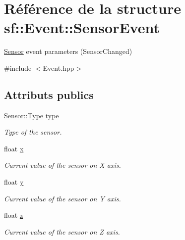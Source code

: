 \hypertarget{structsf_1_1Event_1_1SensorEvent}{}\section{Référence de la structure sf\+:\+:Event\+:\+:Sensor\+Event}
\label{structsf_1_1Event_1_1SensorEvent}


\hyperlink{classsf_1_1Sensor}{Sensor} event parameters (Sensor\+Changed)  




{\ttfamily \#include $<$Event.\+hpp$>$}

\subsection*{Attributs publics}
\begin{DoxyCompactItemize}
\item 
\mbox{\label{structsf_1_1Event_1_1SensorEvent_abee7d67bf0947fd1138e4466011e2436}} 
\hyperlink{classsf_1_1Sensor_a687375af3ab77b818fca73735bcaea84}{Sensor\+::\+Type} \hyperlink{structsf_1_1Event_1_1SensorEvent_abee7d67bf0947fd1138e4466011e2436}{type}
\begin{DoxyCompactList}\small\item\em Type of the sensor. \end{DoxyCompactList}\item 
\mbox{\label{structsf_1_1Event_1_1SensorEvent_aa6ccbd13c181b866a6467462158d93d9}} 
float \hyperlink{structsf_1_1Event_1_1SensorEvent_aa6ccbd13c181b866a6467462158d93d9}{x}
\begin{DoxyCompactList}\small\item\em Current value of the sensor on X axis. \end{DoxyCompactList}\item 
\mbox{\label{structsf_1_1Event_1_1SensorEvent_aecafcd25ecb3ba486e42284e4bb69a57}} 
float \hyperlink{structsf_1_1Event_1_1SensorEvent_aecafcd25ecb3ba486e42284e4bb69a57}{y}
\begin{DoxyCompactList}\small\item\em Current value of the sensor on Y axis. \end{DoxyCompactList}\item 
\mbox{\label{structsf_1_1Event_1_1SensorEvent_a5704e0d0b82b07f051cc858894f3ea43}} 
float \hyperlink{structsf_1_1Event_1_1SensorEvent_a5704e0d0b82b07f051cc858894f3ea43}{z}
\begin{DoxyCompactList}\small\item\em Current value of the sensor on Z axis. \end{DoxyCompactList}\end{DoxyCompactItemize}


